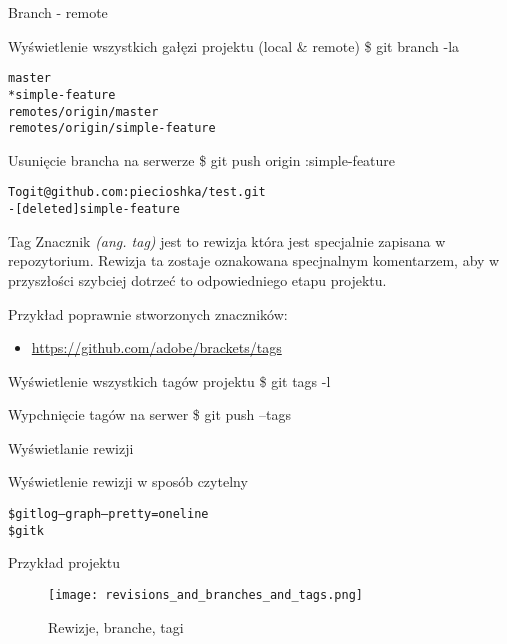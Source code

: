 \documentclass{beamer}
\begin{document}
\begin{frame}{Branch - remote}
\begin{block}{Wyświetlenie wszystkich gałęzi projektu (local \& remote)}
\$ git branch -la
\begin{alltt}
  master \\
* simple-feature \\
  remotes/origin/master \\
  remotes/origin/simple-feature
\end{alltt}
\end{block}
\begin{block}{Usunięcie brancha na serwerze}
\$ git push origin :simple-feature
\begin{alltt}
To git@github.com:piecioshka/test.git \\
 - [deleted]         simple-feature
\end{alltt}
\end{block}
\end{frame}

\begin{frame}{Tag}
Znacznik \textit{(ang. tag)} jest to rewizja która jest specjalnie zapisana w repozytorium.
Rewizja ta zostaje oznakowana specjnalnym komentarzem, aby w przyszłości szybciej dotrzeć to odpowiedniego etapu projektu.

Przykład poprawnie stworzonych znaczników:
\begin{itemize}
  \item \url{https://github.com/adobe/brackets/tags}
\end{itemize}
\vskip 1cm
\begin{block}{Wyświetlenie wszystkich tagów projektu}
\$ git tags -l
\end{block}
\begin{block}{Wypchnięcie tagów na serwer}
\$ git push --tags
\end{block}
\end{frame}

\begin{frame}{Wyświetlanie rewizji}
\begin{block}{Wyświetlenie rewizji w sposób czytelny}
\begin{alltt}
\$ git log --graph --pretty=oneline
\$ gitk
\end{alltt}
\end{block}
\end{frame}

\begin{frame}{Przykład projektu}
	\begin{figure}
	\texttt{[image: revisions\_and\_branches\_and\_tags.png]}
	\caption{\label{Branches}Rewizje, branche, tagi}
	\end{figure}
\end{frame}
\end{document}
